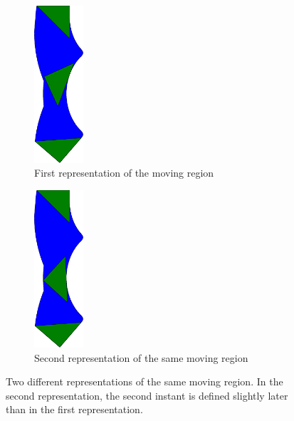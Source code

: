 \begin{figure}[h!]
    \centering
    \begin{subfigure}{.475\textwidth}
        \centering
        \includegraphics[width=0.2\textwidth]{images/collinear_not_redundant.pdf}
        \caption{First representation of the moving region}
    \end{subfigure}
    \hfill
    \begin{subfigure}{.475\textwidth}
        \centering
        \includegraphics[width=0.2\textwidth]{images/same_tgeometry_diff_repr.pdf}
        \caption{Second representation of the same moving region}
    \end{subfigure}
    \caption[Two different representations of the same moving region]{Two different representations of the same moving region. In the second representation, the second instant is defined slightly later than in the first representation.}
    \label{fig:same_tgeometry_diff_repr}
\end{figure}

